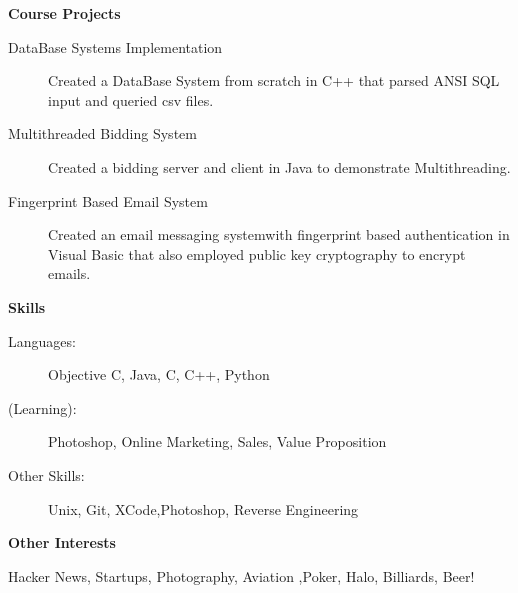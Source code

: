 \documentclass[letterpaper,11pt]{article}
\newcommand{\resheading}[1]{{\large \colorbox{mygrey}{\begin{minipage}{\textwidth}{\textbf{#1 \vphantom{p\^{E}}}}\end{minipage}}}}
\begin{document}
\resheading{Course Projects}
\begin{description}
\item[DataBase Systems Implementation] Created a DataBase System from scratch in C++ that parsed ANSI SQL input and queried csv files.
\item[Multithreaded Bidding System] Created a bidding server and client in Java to demonstrate Multithreading.
\item[Fingerprint Based Email System] Created an email messaging systemwith fingerprint based authentication in Visual Basic that also employed public key cryptography to encrypt emails.
\end{description}

\resheading{Skills}
\begin{description}
\item[Languages:]
Objective C, Java, C, C++, Python
\item[(Learning):]
Photoshop, Online Marketing, Sales, Value Proposition
\item[Other Skills:]
Unix, Git, XCode,Photoshop, Reverse Engineering 
\end{description}



\resheading{Other Interests}
\begin{description}
\item Hacker News, Startups, Photography, Aviation ,Poker, Halo, Billiards, Beer!
\end{description}
\end{document}
